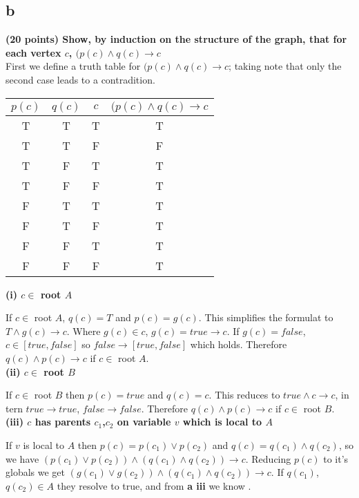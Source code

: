 \documentclass{article}
\begin{document}
\subsection{b}
%
\textbf{(20 points) Show, by induction on the structure of the graph,
that for each vertex $c$, $(p(c) \wedge q(c) \rightarrow c$} \\
%
First we define a truth table for $(p(c) \wedge q(c) \rightarrow c$;
taking note that only the second case leads to a contradition.\\
%
\begin{tabular}{ c | c | c | c }
\hline
\textbf{$p(c)$} & \textbf{$q(c)$} & \textbf{$c$} &\textbf{$(p(c) \wedge q(c) \rightarrow c$} \\
\hline
\hline
T & T & T & T \\ \hline
T & T & F & F \\ \hline
T & F & T & T \\ \hline
T & F & F & T \\ \hline
F & T & T & T \\ \hline
F & T & F & T \\ \hline
F & F & T & T \\ \hline
F & F & F & T \\ \hline
\end{tabular}


\noindent\textbf{(i) $c \in $ root $A$}

If $c \in $ root $A$, $q(c) = T$ and $p(c) = g(c)$. This simplifies
the formulat to $T \wedge g(c) \rightarrow c$. Where $g(c) \in c$,
$g(c) = true \rightarrow c$. If $g(c) = false$, $c \in [true,false]$
so $false \rightarrow [true,false]$ which holds. Therefore $q(c)
\wedge p(c) \rightarrow c$ if $c \in $ root $A$.\\


\noindent\textbf{(ii) $c \in $ root $B$}

If $c \in $ root $B$ then $p(c) = true$ and $q(c) = c$. This reduces
to $true \wedge c \rightarrow c$, in tern $true \rightarrow true$,
$false \rightarrow false$. Therefore $q(c) \wedge p(c) \rightarrow c$
if $c \in $ root $B$.\\


\noindent\textbf{(iii) $c$ has parents $c_1$,$c_2$ on variable $v$ which is local to $A$}

If $v$ is local to $A$ then $p(c) = p(c_1) \vee p(c_2)$ and $q(c) =
q(c_1) \wedge q(c_2)$, so we have $(p(c_1) \vee p(c_2)) \wedge (q(c_1)
\wedge q(c_2)) \rightarrow c$. Reducing $p(c)$ to it's globals we get
$(g(c_1) \vee g(c_2)) \wedge (q(c_1) \wedge q(c_2)) \rightarrow c$. If $q(c_1)$,$q(c_2) \in A$ they resolve to true, and from \textbf{a iii} we know .
\end{document}
